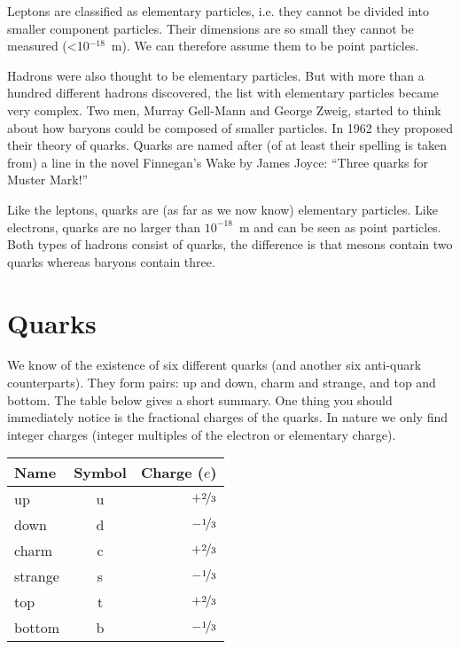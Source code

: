 \vspace{0.5cm}

Leptons are classified as elementary particles, i.e. they cannot be divided into smaller component particles. Their dimensions are so small they cannot be measured (\textless10$^{-18}$~m). We can therefore assume them to be point particles.

Hadrons were also thought to be elementary particles. But with more than a hundred different hadrons discovered, the list with elementary particles became very complex. Two men, Murray Gell-Mann and George Zweig, started to think about how baryons could be composed of smaller particles. In 1962 they proposed their theory of quarks. Quarks are named after (of at least their spelling is taken from) a line in the novel Finnegan's Wake by James Joyce: ``Three quarks for Muster Mark!''

Like the leptons, quarks are (as far as we now know) elementary particles. Like electrons, quarks are no larger than $10^{-18}$~m and can be seen as point particles. Both types of hadrons consist of quarks, the difference is that mesons contain two quarks whereas baryons contain three.

\section{Quarks}
We know of the existence of six different quarks (and another six anti-quark counterparts). They form pairs: up and down, charm and strange, and top and bottom. The table below gives a short summary. One thing you should immediately notice is the fractional charges of the quarks. In nature we only find integer charges (integer multiples of the electron or elementary charge).

\begin{center}\begin{tabular}[h] {l c r}
Name & Symbol & Charge ($e$) \\ \hline
up & u & $+\nicefrac{2}{3}$ \\
down & d & $-\nicefrac{1}{3}$ \\
charm & c & $+\nicefrac{2}{3}$ \\
strange & s & $-\nicefrac{1}{3}$ \\
top & t & $+\nicefrac{2}{3}$ \\
bottom & b & $-\nicefrac{1}{3}$ \\
\end{tabular}\end{center}
\label{tab:data_3}

